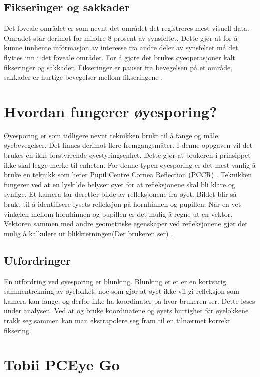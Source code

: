 \documentclass[phd,tocprelim]{cornell}
\begin{document}
\subsection{Fikseringer og sakkader}

Det foveale området er som nevnt det området det registreres mest visuell data. Området står derimot for mindre 8 prosent av synsfeltet. Dette gjør at for å kunne innhente informasjon av interesse fra andre deler av synsfeltet må det flyttes inn i  det foveale området. For å gjøre det brukes øyeoperasjoner kalt fikseringer og sakkader. Fikseringer er pauser fra bevegelsen på et område, sakkader er hurtige bevegelser mellom fikseringene \cite{Calibration}.


\section{Hvordan fungerer øyesporing?}

Øyesporing er som tidligere nevnt teknikken brukt til å fange og måle øyebevegelser.
Det finnes derimot flere fremgangsmåter. I denne oppgaven vil det brukes en ikke-forstyrrende øyestyringsenhet. Dette gjør at brukeren i prinsippet ikke skal legge merke til enheten. For denne typen øyesporing er det mest vanlig å bruke en teknikk som heter Pupil Centre Cornea Reflection (\gls{PCCR}) \cite{Calibration}. Teknikken fungerer ved at en lyskilde belyser øyet for at refleksjonene skal bli klare og synlige. Et kamera tar deretter bilde av refleksjonene fra øyet. Bildet blir så brukt til å identifisere lysets refleksjon på hornhinnen og pupillen. Når en vet vinkelen mellom hornhinnen og pupillen er det mulig å regne ut en vektor. Vektoren sammen med andre geometriske egenskaper ved refleksjonene gjør det mulig å kalkulere ut blikkretningen(Der brukeren ser) \cite{Calibration}.


\subsection{Utfordringer}

En utfordring ved øyesporing er blunking. Blunking er et er en kortvarig sammentrekning av øyelokket, noe som gjør at øyet ikke vil gi refleksjon som kamera kan fange, og derfor ikke ha koordinater på hvor brukeren ser. Dette løses under analysen. Ved at og bruke koordinatene og øyets hurtighet før øyelokkene trakk seg sammen kan man ekstrapolere seg fram til en tilnærmet korrekt fiksering. 

\section{Tobii PCEye Go}
\end{document}
